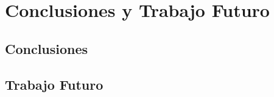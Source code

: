 \documentclass[a4paper,12pt]{article}
\begin{document}
\newpage
\section{Conclusiones y Trabajo Futuro} \label{sec:conclusiones}

\subsection{Conclusiones}



\subsection{Trabajo Futuro}


\newpage






\appendix
\end{document}
